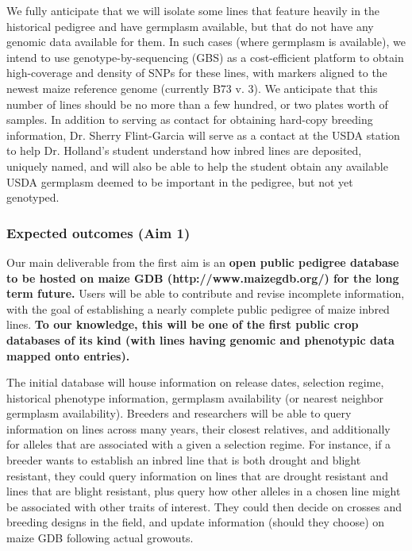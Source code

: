 \documentclass[draft,12pt]{article}
\begin{document}
We fully anticipate that we will isolate some lines that feature heavily in the historical pedigree and have germplasm available, but that do not have any genomic data available for them. 
In such cases (where germplasm is available), we intend to use genotype-by-sequencing (GBS) \citep{Elshire:2011ha} as a cost-efficient platform \citep{Glaubitz:2014eu} to obtain high-coverage and density of SNPs  for these lines, with markers aligned to the newest maize reference genome (currently B73 v. 3). We anticipate that this number of lines should be no more than a few hundred, or two plates worth of samples.
In addition to serving as contact for obtaining hard-copy breeding information, Dr. Sherry Flint-Garcia will serve as a contact at the USDA station to help Dr. Holland's student understand how inbred lines are deposited, uniquely named, and will also be able to help the student obtain any available USDA germplasm deemed to be important in the pedigree, but not yet genotyped.


\subsubsection*{Expected outcomes (Aim 1)}
Our main deliverable from the first aim is an \textbf{open public pedigree database to be hosted on maize GDB (http://www.maizegdb.org/) for the long term future.} Users will be able to contribute and revise incomplete information, with the goal of establishing a nearly complete public pedigree of maize inbred lines. \textbf{To our knowledge, this will be one of the first public crop databases of its kind (with lines having genomic and phenotypic data mapped onto entries).}  

The initial database will house information on release dates, selection regime, historical phenotype information, germplasm availability (or nearest neighbor germplasm availability).
Breeders and researchers will be able to query information on lines across many years, their closest relatives, and additionally for alleles that are associated with a given a selection regime. 
For instance, if a breeder wants to establish an inbred line that is both drought and blight resistant, they could query information on lines that are drought resistant and lines that are blight resistant, plus query how other alleles in a chosen line might be associated with other traits of interest. They could then decide on crosses and breeding designs in the field, and update information (should they choose) on maize GDB following actual growouts.
\end{document}
